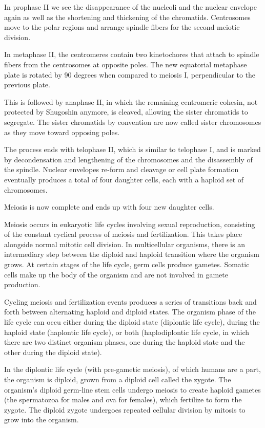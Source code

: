 In prophase II we see the disappearance of the nucleoli and the nuclear envelope again as well as the shortening and thickening of the chromatids. Centrosomes move to the polar regions and arrange spindle fibers for the second meiotic division.

In metaphase II, the centromeres contain two kinetochores that attach to spindle fibers from the centrosomes at opposite poles. The new equatorial metaphase plate is rotated by 90 degrees when compared to meiosis I, perpendicular to the previous plate.

This is followed by anaphase II, in which the remaining centromeric cohesin, not protected by Shugoshin anymore, is cleaved, allowing the sister chromatids to segregate. The sister chromatids by convention are now called sister chromosomes as they move toward opposing poles.

The process ends with telophase II, which is similar to telophase I, and is marked by decondensation and lengthening of the chromosomes and the disassembly of the spindle. Nuclear envelopes re-form and cleavage or cell plate formation eventually produces a total of four daughter cells, each with a haploid set of chromosomes.

Meiosis is now complete and ends up with four new daughter cells.

Meiosis occurs in eukaryotic life cycles involving sexual reproduction, consisting of the constant cyclical process of meiosis and fertilization. This takes place alongside normal mitotic cell division. In multicellular organisms, there is an intermediary step between the diploid and haploid transition where the organism grows. At certain stages of the life cycle, germ cells produce gametes. Somatic cells make up the body of the organism and are not involved in gamete production.

Cycling meiosis and fertilization events produces a series of transitions back and forth between alternating haploid and diploid states. The organism phase of the life cycle can occu either during the diploid state (diplontic life cycle), during the haploid state (haplontic life cycle), or both (haplodiplontic life cycle, in which there are two distinct organism phases, one during the haploid state and the other during the diploid state).

In the diplontic life cycle (with pre-gametic meiosis), of which humans are a part, the organism is diploid, grown from a diploid cell called the zygote. The organism's diploid germ-line stem cells undergo meiosis to create haploid gametes (the spermatozoa for males and ova for females), which fertilize to form the zygote. The diploid zygote undergoes repeated cellular division by mitosis to grow into the organism.

